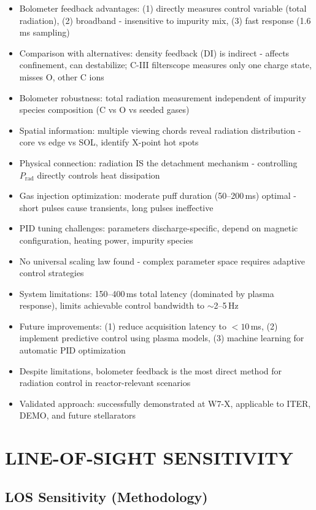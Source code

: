 \documentclass[11pt,a4paper]{article}
\begin{document}
\begin{itemize}
\item Bolometer feedback advantages: (1) directly measures control variable (total radiation), (2) broadband - insensitive to impurity mix, (3) fast response (1.6\,ms sampling)
\item Comparison with alternatives: density feedback (DI) is indirect - affects confinement, can destabilize; C-III filterscope measures only one charge state, misses O, other C ions
\item Bolometer robustness: total radiation measurement independent of impurity species composition (C vs O vs seeded gases)
\item Spatial information: multiple viewing chords reveal radiation distribution - core vs edge vs SOL, identify X-point hot spots
\item Physical connection: radiation IS the detachment mechanism - controlling $P_{\text{rad}}$ directly controls heat dissipation
\item Gas injection optimization: moderate puff duration (50--200\,ms) optimal - short pulses cause transients, long pulses ineffective
\item PID tuning challenges: parameters discharge-specific, depend on magnetic configuration, heating power, impurity species
\item No universal scaling law found - complex parameter space requires adaptive control strategies
\item System limitations: 150--400\,ms total latency (dominated by plasma response), limits achievable control bandwidth to $\sim$2--5\,Hz
\item Future improvements: (1) reduce acquisition latency to $<10$\,ms, (2) implement predictive control using plasma models, (3) machine learning for automatic PID optimization
\item Despite limitations, bolometer feedback is the most direct method for radiation control in reactor-relevant scenarios
\item Validated approach: successfully demonstrated at W7-X, applicable to ITER, DEMO, and future stellarators
\end{itemize}

\section{LINE-OF-SIGHT SENSITIVITY}

\subsection{LOS Sensitivity (Methodology)}
\end{document}
